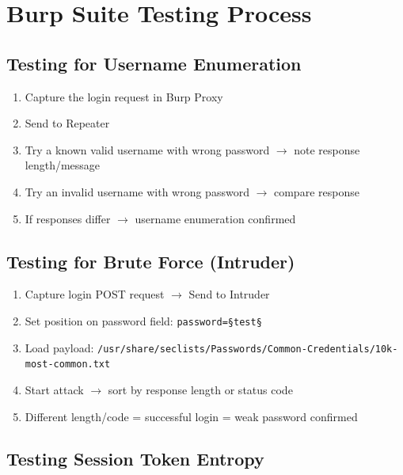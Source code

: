 \section{Burp Suite Testing Process}

\subsection{Testing for Username Enumeration}

\begin{enumerate}
  \item Capture the login request in Burp Proxy
  \item Send to Repeater
  \item Try a known valid username with wrong password $\to$ note response length/message
  \item Try an invalid username with wrong password $\to$ compare response
  \item If responses differ $\to$ username enumeration confirmed
\end{enumerate}

\subsection{Testing for Brute Force (Intruder)}

\begin{enumerate}
  \item Capture login POST request $\to$ Send to Intruder
  \item Set position on password field: \texttt{password=§test§}
  \item Load payload: \texttt{/usr/share/seclists/Passwords/Common-Credentials/10k-most-common.txt}
  \item Start attack $\to$ sort by response length or status code
  \item Different length/code = successful login = weak password confirmed
\end{enumerate}


\subsection{Testing Session Token Entropy}

